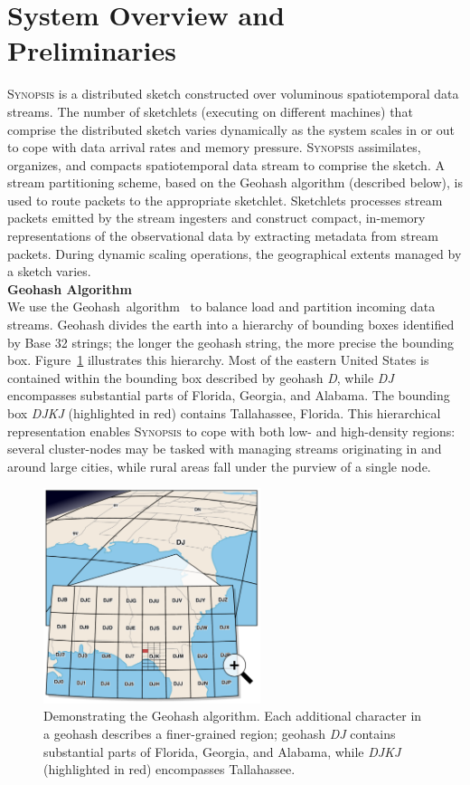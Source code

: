 \section{System Overview and Preliminaries}
\label{sec:system}
\textsc{Synopsis} is a distributed sketch constructed over voluminous spatiotemporal data streams.
The number of sketchlets (executing on different machines) that comprise the distributed sketch varies dynamically as the system scales in or out to cope with data arrival rates and memory pressure.
\textsc{Synopsis} assimilates, organizes, and compacts spatiotemporal data stream to comprise the sketch.
A stream partitioning scheme, based on the Geohash algorithm (described below), is used to route packets to the appropriate sketchlet.
Sketchlets processes stream packets emitted by the stream ingesters and construct compact, in-memory representations of the observational data by extracting metadata from stream packets.
During dynamic scaling operations, the geographical extents managed by a sketch varies.
\vspace{1.5em} \\
\textbf{Geohash Algorithm} \\
We use the Geohash~algorithm~\cite{geohash} to balance load and partition incoming data streams. Geohash divides the earth into a hierarchy of bounding boxes identified by Base 32 strings; the longer the geohash string, the more precise the bounding box. Figure~\ref{fig:geohash} illustrates this hierarchy. Most of the eastern United States is contained within the bounding box described by geohash \emph{D}, while \emph{DJ} encompasses substantial parts of Florida, Georgia, and Alabama. The bounding box \emph{DJKJ} (highlighted in red) contains Tallahassee, Florida. This hierarchical representation enables \textsc{Synopsis} to cope with both low- and high-density regions: several cluster-nodes may be tasked with managing streams originating in and around large cities, while rural areas fall under the purview of a single node.

\begin{figure}[b!]
    \centerline{\includegraphics[width=2.5in]{figures/geohash.pdf}}
    \caption{Demonstrating the Geohash algorithm. Each additional character in a geohash describes a finer-grained region; geohash \emph{DJ} contains substantial parts of Florida, Georgia, and Alabama, while \emph{DJKJ} (highlighted in red) encompasses Tallahassee.}
    \label{fig:geohash}
\end{figure}

